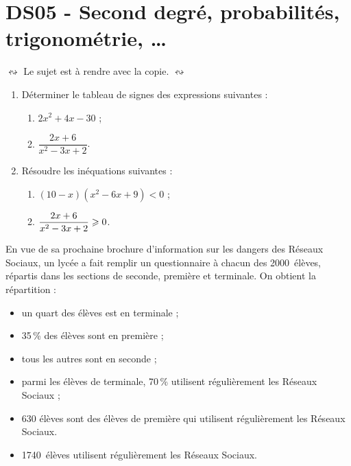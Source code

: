 \documentclass[a4paper,11pt]{article}
\author{Pierquet}
\title{\nomfichier}
\begin{document}
\pagestyle{fancy}

\thispagestyle{enteteds}

\setcounter{numexos}{0}

\part{DS05 - Second degré, probabilités, trigonométrie, \ldots}

\smallskip

\nomprenomtcbox

\begin{marker}$\leftrightsquigarrow$ Le sujet est à rendre avec la copie. $\leftrightsquigarrow$\end{marker}


\begin{enumerate}
	\item Déterminer le tableau de signes des expressions suivantes :
	\begin{enumerate}
		\item $2x^2+4x-30$ ;
		\item $\dfrac{2x+6}{x^2-3x+2}$.
	\end{enumerate}
	\item Résoudre les inéquations suivantes :
	\begin{enumerate}
		\item $(10-x)(x^2-6x+9)<0$ ;
		\item $\dfrac{2x+6}{x^2-3x+2} \geqslant 0$.
	\end{enumerate}
\end{enumerate}

\medskip


\medskip

En vue de sa prochaine brochure d'information sur les dangers des Réseaux Sociaux, un lycée a fait remplir un questionnaire à chacun des \num{2000}~élèves, répartis dans les sections de seconde, première et terminale. On obtient la répartition : 

\begin{itemize}
	\item un quart des élèves est en terminale ; 
	\item 35\,\% des élèves sont en première ; 
	\item tous les autres sont en seconde ; 
	\item parmi les élèves de terminale, 70\,\% utilisent régulièrement les Réseaux Sociaux ; 
	\item 630 élèves sont des élèves de première qui utilisent régulièrement les Réseaux Sociaux. 
	\item \num{1740}~élèves utilisent régulièrement les Réseaux Sociaux.
\end{itemize}
\end{document}
